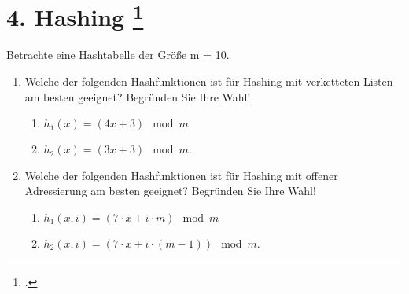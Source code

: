 \documentclass{lehramt-informatik-aufgabe}
\begin{document}

\section{4. Hashing
\footcite[Thema 2 Aufgabe 4 Seite 7]{examen:66115:2016:03}}

Betrachte eine Hashtabelle der Größe m = 10.

\begin{enumerate}


\item Welche der folgenden Hashfunktionen ist für Hashing mit
verketteten Listen am besten geeignet? Begründen Sie Ihre Wahl!

\begin{enumerate}
\item $h_1(x) = (4x + 3) \mod m$
\item $h_2(x) = (3x + 3) \mod m$.
\end{enumerate}


\item Welche der folgenden Hashfunktionen ist für Hashing mit offener
Adressierung am besten geeignet? Begründen Sie Ihre Wahl!

\begin{enumerate}
\item $h_1(x,i) = (7 \cdot x + i \cdot m) \mod m$
\item $h_2(x,i) = (7 \cdot x + i \cdot (m - 1)) \mod m$.
\end{enumerate}
\end{enumerate}
\end{document}
